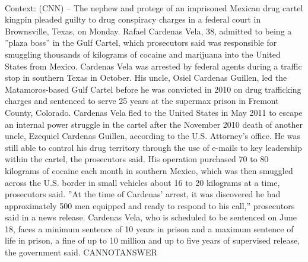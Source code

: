 \documentclass[11pt,a4paper, onecolumn]{article}
\begin{document}
\\ Context: (CNN) -- The nephew and protege of an imprisoned Mexican drug cartel kingpin pleaded guilty to drug conspiracy charges in a federal court in Brownsville, Texas, on Monday. Rafael Cardenas Vela, 38, admitted to being a ''plaza boss'' in the Gulf Cartel, which prosecutors said was responsible for smuggling thousands of kilograms of cocaine and marijuana into the United States from Mexico. Cardenas Vela was arrested by federal agents during a traffic stop in southern Texas in October. His uncle, Osiel Cardenas Guillen, led the Matamoros-based Gulf Cartel before he was convicted in 2010 on drug trafficking charges and sentenced to serve 25 years at the supermax prison in Fremont County, Colorado. Cardenas Vela fled to the United States in May 2011 to escape an internal power struggle in the cartel after the November 2010 death of another uncle, Ezequiel Cardenas Guillen, according to the U.S. Attorney's office. He was still able to control his drug territory through the use of e-mails to key leadership within the cartel, the prosecutors said. His operation purchased 70 to 80 kilograms of cocaine each month in southern Mexico, which was then smuggled across the U.S. border in small vehicles about 16 to 20 kilograms at a time, prosecutors said. ''At the time of Cardenas' arrest, it was discovered he had approximately 500 men equipped and ready to respond to his call,'' prosecutors said in a news release. Cardenas Vela, who is scheduled to be sentenced on June 18, faces a minimum sentence of 10 years in prison and a maximum sentence of life in prison, a fine of up to  10 million and up to five years of supervised release, the government said. CANNOTANSWER
\end{document}
